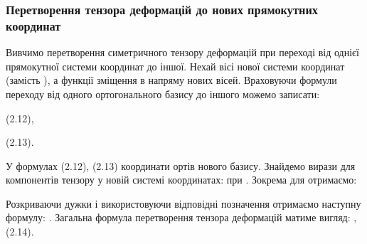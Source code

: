 \subsubsection{Перетворення тензора деформацій до нових прямокутних координат}

Вивчимо перетворення симетричного тензору деформацій при переході від однієї прямокутної системи координат до іншої. Нехай   вісі нової системи координат (замість  ), а функції   зміщення в напряму нових вісей.
Враховуючи формули переходу від одного ортогонального базису до іншого можемо записати:
  
  					(2.12),
 
  
  
  
 					(2.13).
  
 
У формулах (2.12), (2.13)   координати ортів нового базису.
Знайдемо вирази для компонентів тензору у новій системі координатах:   при  .
Зокрема для   отримаємо:
     
Розкриваючи дужки і використовуючи відповідні позначення отримаємо наступну формулу: 	 .
Загальна формула перетворення тензора деформацій матиме вигляд:
 ,  			(2.14).

